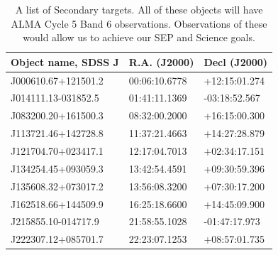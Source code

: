 \footnotesize 
\begin{table}
  \begin{center}
    \footnotesize 
    \begin{tabular}{|| l | l  l ||}
      \hline \hline
      Object name, SDSS J  	& R.A. (J2000) & Decl (J2000) \\
      \hline
      J000610.67+121501.2 &     00:06:10.6778 &+12:15:01.274 \\
      J014111.13-031852.5 &     01:41:11.1369 & -03:18:52.567 \\
      J083200.20+161500.3  & 08:32:00.2000 & +16:15:00.300 \\
      J113721.46+142728.8 &     11:37:21.4663 & +14:27:28.879 \\
      J121704.70+023417.1 & 12:17:04.7013 & +02:34:17.151 \\
      J134254.45+093059.3 &     13:42:54.4591 & +09:30:59.396  \\
      J135608.32+073017.2 & 13:56:08.3200 & +07:30:17.200\\
      J162518.66+144509.9 &     16:25:18.6600 & +14:45:09.900 \\
      J215855.10-014717.9 &     21:58:55.1028& -01:47:17.973 \\
      J222307.12+085701.7 & 22:23:07.1253 & +08:57:01.735\\
      \hline\hline
    \end{tabular}
    \caption{A list of Secondary targets. All of these objects will
      have ALMA Cycle 5 Band 6 observations. Observations of these would
      allow us to achieve our SEP and Science goals.}
\label{tab:backups} 
\end{center}
\end{table}
\normalsize




